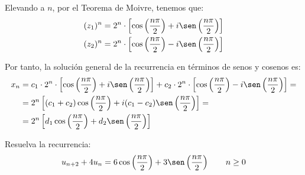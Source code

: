 \begin{ejercicio}
    Elevando a $n$, por el Teorema de Moivre, tenemos que:
    \begin{align*}
        (z_1)^n &= 2^n\cdot \left[\cos\left(\frac{n\pi}{2}\right) + i\sen\left(\frac{n\pi}{2}\right)\right]\\
        (z_2)^n &= 2^n\cdot \left[\cos\left(\frac{n\pi}{2}\right) - i\sen\left(\frac{n\pi}{2}\right)\right]
    \end{align*}

    Por tanto, la solución general de la recurrencia en términos de senos y cosenos es:
    \begin{align*}
        x_n &= c_1\cdot 2^n\cdot \left[\cos\left(\frac{n\pi}{2}\right) + i\sen\left(\frac{n\pi}{2}\right)\right] + c_2\cdot 2^n\cdot \left[\cos\left(\frac{n\pi}{2}\right) - i\sen\left(\frac{n\pi}{2}\right)\right] =\\
        &= 2^n\left[(c_1+c_2)\cos\left(\frac{n\pi}{2}\right) + i(c_1-c_2)\sen\left(\frac{n\pi}{2}\right)\right] =\\
        &= 2^n\left[d_1\cos\left(\frac{n\pi}{2}\right) + d_2\sen\left(\frac{n\pi}{2}\right)\right]
    \end{align*}
\end{ejercicio}

\begin{ejercicio}
    Resuelva la recurrencia:
    \begin{equation*}
        u_{n+2} + 4u_n = 6\cos\left(\frac{n\pi}{2}\right) + 3\sen\left(\frac{n\pi}{2}\right) \qquad n\geq 0
    \end{equation*}

    \begin{comment}
    Por el ejercicio~\ref{ej:recurrenciaComplejos}, tenemos que:
    \begin{equation*}
        x_n^{(h)} = 2^n\left[d_1\cos\left(\frac{n\pi}{2}\right) + d_2\sen\left(\frac{n\pi}{2}\right)\right]
    \end{equation*}
    \end{comment}
\end{ejercicio}

